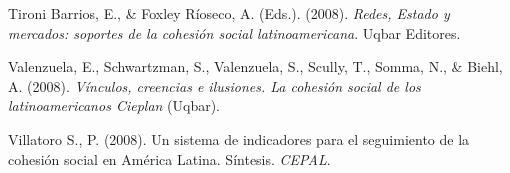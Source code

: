 \documentclass[
  12pt,
]{book}
\begin{document}
\leavevmode\hypertarget{ref-tironibarrios_redes_2008}{}%
Tironi Barrios, E., \& Foxley Ríoseco, A. (Eds.). (2008). \emph{Redes, Estado y mercados: soportes de la cohesión social latinoamericana}. Uqbar Editores.

\leavevmode\hypertarget{ref-valenzuela_vinculos_2008}{}%
Valenzuela, E., Schwartzman, S., Valenzuela, S., Scully, T., Somma, N., \& Biehl, A. (2008). \emph{Vínculos, creencias e ilusiones. La cohesión social de los latinoamericanos Cieplan} (Uqbar).

\leavevmode\hypertarget{ref-villatoros._sistema_2008}{}%
Villatoro S., P. (2008). Un sistema de indicadores para el seguimiento de la cohesión social en América Latina. Síntesis. \emph{CEPAL}.
\end{document}
